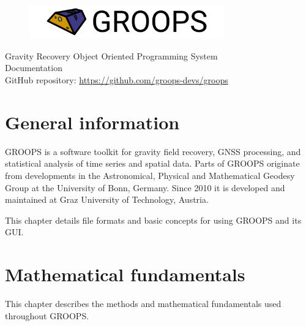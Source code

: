 \documentclass[10pt,twoside,titlepage]{report}
\begin{document}
\hfuzz=5000pt
\vfuzz=5000pt

\graphicspath{{../figures/}}

\thispagestyle{empty}
\begin{center}
\vspace*{6cm}
\begin{figure}[!h]
\centering
\includegraphics*[width=0.75\textwidth]{groops_banner}
\end{figure}
\vspace*{0.2cm}
{\huge\sf Gravity Recovery Object Oriented Programming System} \\
\vspace*{2cm}
{\huge\sf Documentation} \\
\vspace*{2cm}
{\Large\sf GitHub repository: \url{https://github.com/groops-devs/groops}}
\end{center}

\newpage
\clearpage{\pagestyle{empty}} %
\tableofcontents%
\clearpage{\pagestyle{empty}\cleardoublepage\clearpage}

\chapter{General information}
GROOPS is a software toolkit for gravity field recovery, GNSS processing, and statistical analysis of time series and spatial data.
Parts of GROOPS originate from developments in the Astronomical, Physical and Mathematical Geodesy Group
at the University of Bonn, Germany.
Since 2010 it is developed and maintained at Graz University of Technology, Austria.

This chapter details file formats and basic concepts for using GROOPS and its GUI.

\clearpage

\clearpage

\clearpage

\clearpage

\clearpage

\clearpage


\clearpage

\chapter{Mathematical fundamentals}
This chapter describes the methods and mathematical fundamentals used throughout GROOPS.

\clearpage

\clearpage

\end{document}
